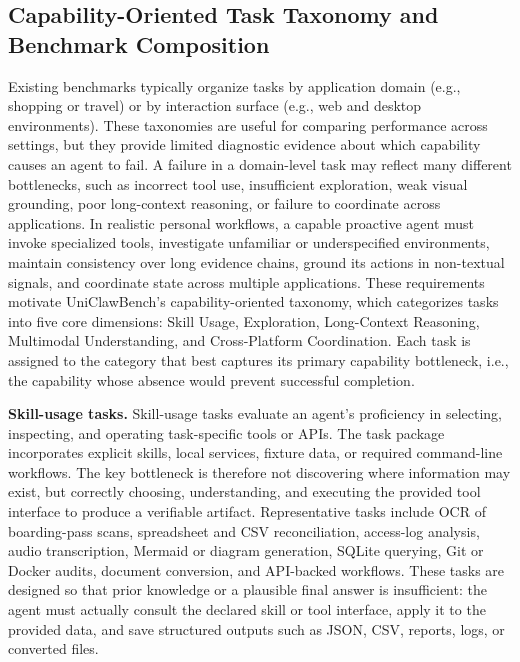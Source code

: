 \subsection{Capability-Oriented Task Taxonomy and Benchmark Composition}
\label{sec:taxonomy}
Existing benchmarks typically organize tasks by application domain (e.g., shopping or travel) or by interaction surface (e.g., web and desktop environments). These taxonomies are useful for comparing performance across settings, but they provide limited diagnostic evidence about which capability causes an agent to fail. A failure in a domain-level task may reflect many different bottlenecks, such as incorrect tool use, insufficient exploration, weak visual grounding, poor long-context reasoning, or failure to coordinate across applications.
In realistic personal workflows, a capable proactive agent must invoke specialized tools, investigate unfamiliar or underspecified environments, maintain consistency over long evidence chains, ground its actions in non-textual signals, and coordinate state across multiple applications. These requirements motivate UniClawBench's capability-oriented taxonomy, which categorizes tasks into five core dimensions: Skill Usage, Exploration, Long-Context Reasoning, Multimodal Understanding, and Cross-Platform Coordination. Each task is assigned to the category that best captures its primary capability bottleneck, i.e., the capability whose absence would prevent successful completion.

\textbf{Skill-usage tasks.}
Skill-usage tasks evaluate an agent's proficiency in selecting, inspecting, and operating task-specific tools or APIs. The task package incorporates explicit skills, local services, fixture data, or required command-line workflows. The key bottleneck is therefore not discovering where information may exist, but correctly choosing, understanding, and executing the provided tool interface to produce a verifiable artifact. Representative tasks include OCR of boarding-pass scans, spreadsheet and CSV reconciliation, access-log analysis, audio transcription, Mermaid or diagram generation, SQLite querying, Git or Docker audits, document conversion, and API-backed workflows. These tasks are designed so that prior knowledge or a plausible final answer is insufficient: the agent must actually consult the
declared skill or tool interface, apply it to the provided data, and save structured outputs such as JSON, CSV, reports, logs, or converted files.

